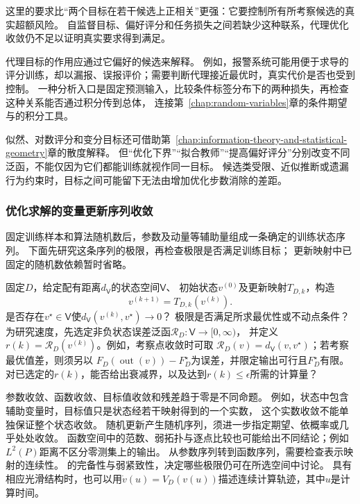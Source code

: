 这里的要求比“两个目标在若干候选上正相关”更强：它要控制所有所考察候选的真实超额风险。
自监督目标、偏好评分和任务损失之间若缺少这种联系，代理优化收敛仍不足以证明真实要求得到满足。

代理目标的作用应通过它偏好的候选来解释。
例如，报警系统可能用便于求导的评分训练，却以漏报、误报评价；需要判断代理接近最优时，真实代价是否也受到控制。
一种分析入口是固定预测输入，比较条件标签分布下的两种损失，再检查这种关系能否通过积分传到总体，
连接第~\ref{chap:random-variables}章的条件期望与的积分工具。

似然、对数评分和变分目标还可借助第~\ref{chap:information-theory-and-statistical-geometry}章的散度解释。
但“优化下界”“拟合教师”“提高偏好评分”分别改变不同泛函，不能仅因为它们都能训练就视作同一目标。
候选类受限、近似推断或遗漏行为约束时，目标之间可能留下无法由增加优化步数消除的差距。

\subsubsection{优化求解的变量更新序列收敛}
\label{sec:future-analysis-convergence}

固定训练样本和算法随机数后，参数及动量等辅助量组成一条确定的训练状态序列。
下面先研究这条序列的极限，再检查极限是否满足训练目标；
更新映射中已固定的随机数依赖暂时省略。

\begin{mathproblem}[训练序列的极限与速度]
  \label{question:future-convergence}
  固定$D$，给定配有距离$d_{\mathsf V}$的状态空间$\mathsf V$、
  初始状态$v^{(0)}$及更新映射$T_{D,k}$，构造
  \[
    v^{(k+1)}=T_{D,k}(v^{(k)}).
  \]
  是否存在$v^\star\in\mathsf V$使$d_{\mathsf V}(v^{(k)},v^\star)\to0$？
  极限是否满足所求最优性或不动点条件？
  为研究速度，先选定非负状态误差泛函$\mathcal R_D:\mathsf V\to[0,\infty)$，
  并定义$r(k)=\mathcal R_D(v^{(k)})$。例如，考察点收敛时可取
  $\mathcal R_D(v)=d_{\mathsf V}(v,v^\star)$；若考察最优值差，则须另以
  $F_D(\operatorname{out}(v))-F_D^\star$为误差，并限定输出可行且$F_D^\star$有限。
  对已选定的$r(k)$，能否给出衰减界，以及达到$r(k)\leq\epsilon$所需的计算量？
\end{mathproblem}

参数收敛、函数收敛、目标值收敛和残差趋于零是不同命题。
例如，状态中包含辅助变量时，目标值只是状态经若干映射得到的一个实数，
这个实数收敛不能单独保证整个状态收敛。
随机更新产生随机序列，须进一步指定期望、依概率或几乎处处收敛。
函数空间中的范数、弱拓扑与逐点比较也可能给出不同结论；例如$L^2(P)$距离不区分零测集上的输出。
从参数序列转到函数序列，需要检查表示映射的连续性。
的完备性与弱紧致性，决定哪些极限仍可在所选空间中讨论。
具有相应光滑结构时，也可以用$\dot v(u)=V_D(v(u))$描述连续计算轨迹，其中$u$是计算时间。

